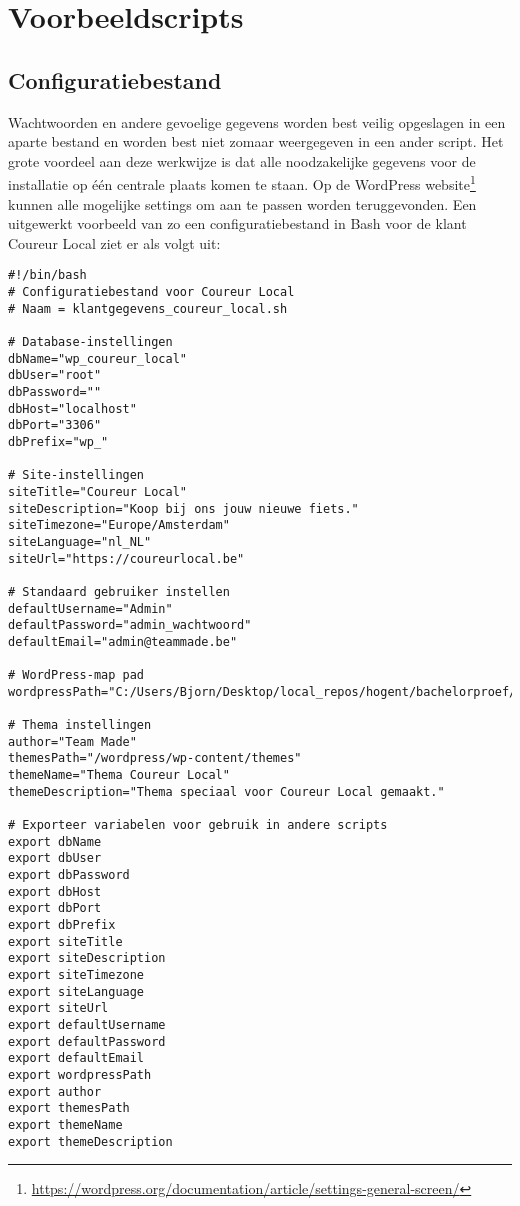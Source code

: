 \section{Voorbeeldscripts}
\label{klantgegevens_coureur_local}\subsection{Configuratiebestand}
Wachtwoorden en andere gevoelige gegevens worden best veilig opgeslagen in een aparte bestand en worden best niet zomaar weergegeven in een ander script. Het grote voordeel aan deze werkwijze is dat alle noodzakelijke gegevens voor de installatie op één centrale plaats komen te staan. Op de WordPress website\footnote{\href{https://wordpress.org/documentation/article/settings-general-screen/}{https://wordpress.org/documentation/article/settings-general-screen/}} kunnen alle mogelijke settings om aan te passen worden teruggevonden. Een uitgewerkt voorbeeld van zo een configuratiebestand in Bash voor de klant Coureur Local ziet er als volgt uit:
\begin{verbatim}
#!/bin/bash
# Configuratiebestand voor Coureur Local
# Naam = klantgegevens_coureur_local.sh

# Database-instellingen
dbName="wp_coureur_local"
dbUser="root"
dbPassword=""
dbHost="localhost"
dbPort="3306"
dbPrefix="wp_"

# Site-instellingen
siteTitle="Coureur Local"
siteDescription="Koop bij ons jouw nieuwe fiets."
siteTimezone="Europe/Amsterdam"
siteLanguage="nl_NL"
siteUrl="https://coureurlocal.be"

# Standaard gebruiker instellen
defaultUsername="Admin"
defaultPassword="admin_wachtwoord"
defaultEmail="admin@teammade.be"

# WordPress-map pad
wordpressPath="C:/Users/Bjorn/Desktop/local_repos/hogent/bachelorproef/coureur_local/wordpress"

# Thema instellingen
author="Team Made"
themesPath="/wordpress/wp-content/themes"
themeName="Thema Coureur Local"
themeDescription="Thema speciaal voor Coureur Local gemaakt."

# Exporteer variabelen voor gebruik in andere scripts
export dbName
export dbUser
export dbPassword
export dbHost
export dbPort
export dbPrefix
export siteTitle
export siteDescription
export siteTimezone
export siteLanguage
export siteUrl
export defaultUsername
export defaultPassword
export defaultEmail
export wordpressPath
export author
export themesPath
export themeName
export themeDescription
\end{verbatim}

